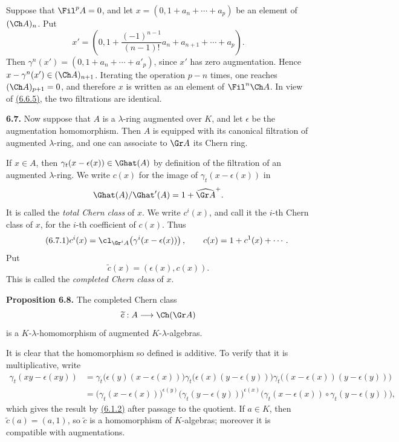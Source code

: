Suppose that \(\Fil^p A=0\), and let \(x=(0,1+a_n+\cdots+a_p)\) be an element of \((\Ch A)_n\). Put
\[
  x'=\left(0,1+\frac{(-1)^{n-1}}{(n-1)!}a_n+a_{n+1}+\cdots+a_p\right).
\]
Then \(\gamma^n(x')=(0,1+a_n+\cdots+a'_p)\), since \(x'\) has zero augmentation. Hence \(x-\gamma^n(x')\in(\Ch A)_{n+1}\). Iterating the operation \(p-n\) times, one reaches \((\Ch A)_{p+1}=0\), and therefore \(x\) is written as an element of \(\Fil^n\Ch A\). In view of \hyperlink{sga6.e05.cor.6-6-5}{(6.6.5)}, the two filtrations are identical.

\textbf{6.7.} Now suppose that \(A\) is a \(\lambda\)-ring augmented over \(K\), and let \(\epsilon\) be the augmentation homomorphism. Then \(A\) is equipped with its canonical filtration of augmented \(\lambda\)-ring, and one can associate to \(\Gr A\) its Chern ring.

If \(x\in A\), then \(\gamma_t(x-\epsilon(x))\in\Ghat(A)\) by definition of the filtration of an augmented \(\lambda\)-ring. We write \(c(x)\) for the image of \(\gamma_t(x-\epsilon(x))\) in
\[
  \Ghat(A)/\Ghat'(A)=1+\widehat{\Gr A}^{+}.
\]
It is called the \emph{total Chern class} of \(x\). We write \(c^i(x)\), and call it the \(i\)-th Chern class of \(x\), for the \(i\)-th coefficient of \(c(x)\). Thus
\begin{equation}\tag{6.7.1}
  c^i(x)=\cl_{\Gr^iA}\!\left(\gamma^i(x-\epsilon(x))\right),
  \qquad
  c(x)=1+c^1(x)+\cdots .
\end{equation}
Put
\begin{equation}\tag{6.7.2}
  \widetilde c(x)=(\epsilon(x),c(x)).
\end{equation}
This is called the \emph{completed Chern class} of \(x\).

\textbf{Proposition 6.8.} The completed Chern class
\[
  \widetilde c:A\longrightarrow\Ch(\Gr A)
\]
is a \(K\)-\(\lambda\)-homomorphism of augmented \(K\)-\(\lambda\)-algebras.

It is clear that the homomorphism so defined is additive. To verify that it is multiplicative, write
\[
\begin{aligned}
\gamma_t(xy-\epsilon(xy))
&=\gamma_t\bigl(\epsilon(y)(x-\epsilon(x))\bigr)
  \gamma_t\bigl(\epsilon(x)(y-\epsilon(y))\bigr)
  \gamma_t\bigl((x-\epsilon(x))(y-\epsilon(y))\bigr)\\
&=\bigl(\gamma_t(x-\epsilon(x))\bigr)^{\epsilon(y)}
  \bigl(\gamma_t(y-\epsilon(y))\bigr)^{\epsilon(x)}
  \bigl(\gamma_t(x-\epsilon(x))\circ\gamma_t(y-\epsilon(y))\bigr),
\end{aligned}
\]
which gives the result by \hyperlink{sga6.e05.para.6-1}{(6.1.2)} after passage to the quotient. If \(a\in K\), then \(\widetilde c(a)=(a,1)\), so \(\widetilde c\) is a homomorphism of \(K\)-algebras; moreover it is compatible with augmentations.


